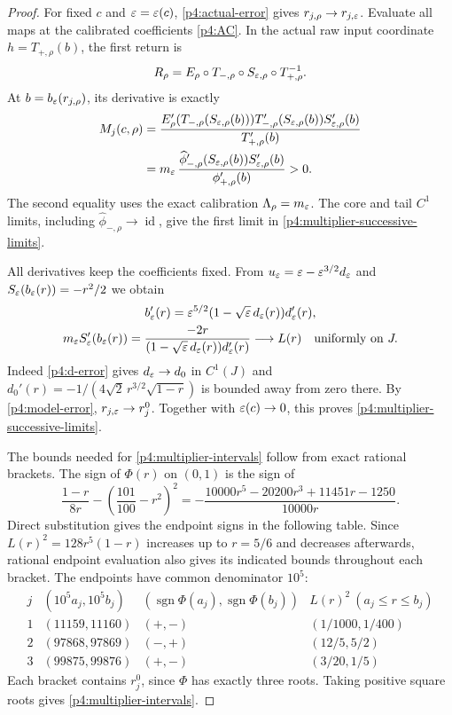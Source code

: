 \begin{proof}
For fixed $c$ and $\varepsilon=\varepsilon(c)$, \eqref{p4:actual-error} gives
$r_{j,\rho}\to r_{j,\varepsilon}$. Evaluate all maps at the calibrated
coefficients \eqref{p4:AC}. In the actual raw input coordinate
$h=T_{+,\rho}(b)$, the first return is
\[
 R_\rho=E_\rho\circ T_{-,\rho}\circ
 S_{\varepsilon,\rho}\circ T_{+,\rho}^{-1}.
\]
At $b=b_\varepsilon(r_{j,\rho})$, its derivative is exactly
\begin{equation}\label{p4:multiplier-exact}
 \begin{split}
 M_j(c,\rho)
 &=\frac{E_\rho'(T_{-,\rho}(S_{\varepsilon,\rho}(b)))
          T_{-,\rho}'(S_{\varepsilon,\rho}(b))
          S_{\varepsilon,\rho}'(b)}{T_{+,\rho}'(b)}\\
 &=m_\varepsilon\,
   \frac{\widehat\phi_{-,\rho}'(S_{\varepsilon,\rho}(b))
          S_{\varepsilon,\rho}'(b)}{\phi_{+,\rho}'(b)}>0.
 \end{split}
\end{equation}
The second equality uses the exact calibration
$\Lambda_\rho=m_\varepsilon$. The core and tail $C^1$ limits, including
$\widehat\phi_{-,\rho}\to\operatorname{id}$, give the first limit
in \eqref{p4:multiplier-successive-limits}.

All derivatives keep the coefficients fixed. From
$u_\varepsilon=\varepsilon-\varepsilon^{3/2}d_\varepsilon$ and
$S_\varepsilon(b_\varepsilon(r))=-r^2/2$ we obtain
\begin{equation}\label{p4:balanced-slope-limit}
 \begin{gathered}
 b_\varepsilon'(r)=\varepsilon^{5/2}(1-\sqrt{\varepsilon}\,d_\varepsilon(r))d_\varepsilon'(r),\\
 m_\varepsilon S_\varepsilon'(b_\varepsilon(r))
 =\frac{-2r}{(1-\sqrt{\varepsilon}\,d_\varepsilon(r))d_\varepsilon'(r)}
 \longrightarrow L(r)
 \quad\text{uniformly on }J.
 \end{gathered}
\end{equation}
Indeed \eqref{p4:d-error} gives $d_\varepsilon\to d_0$ in $C^1(J)$ and
$d_0'(r)=-1/(4\sqrt2\,r^{3/2}\sqrt{1-r})$ is bounded away from
zero there. By \eqref{p4:model-error}, $r_{j,\varepsilon}\to r_j^0$.
Together with $\varepsilon(c)\to0$, this proves
\eqref{p4:multiplier-successive-limits}.

The bounds needed for \eqref{p4:multiplier-intervals} follow from
exact rational brackets. The sign of $\Phi(r)$ on $(0,1)$ is the
sign of
\[
 \frac{1-r}{8r}-\left(\frac{101}{100}-r^2\right)^2
 =-\frac{10000r^5-20200r^3+11451r-1250}{10000r}.
\]
Direct substitution gives the endpoint signs in the following table.
Since $L(r)^2=128r^5(1-r)$ increases up to $r=5/6$ and decreases
afterwards, rational endpoint evaluation also gives its indicated
bounds throughout each bracket. The endpoints have common denominator
$10^5$:
\[
\begin{array}{c|c|c|c}
 j&(10^5a_j,10^5b_j)&(\operatorname{sgn}\Phi(a_j),
                  \operatorname{sgn}\Phi(b_j))
       &L(r)^2\ (a_j\le r\le b_j)\\ \hline
 1&(11159,11160)&(+,-)&(1/1000,1/400)\\
 2&(97868,97869)&(-,+)&(12/5,5/2)\\
 3&(99875,99876)&(+,-)&(3/20,1/5)
\end{array}
\]
Each bracket contains $r_j^0$, since $\Phi$ has exactly three
roots. Taking positive square roots gives
\eqref{p4:multiplier-intervals}.
\end{proof}
